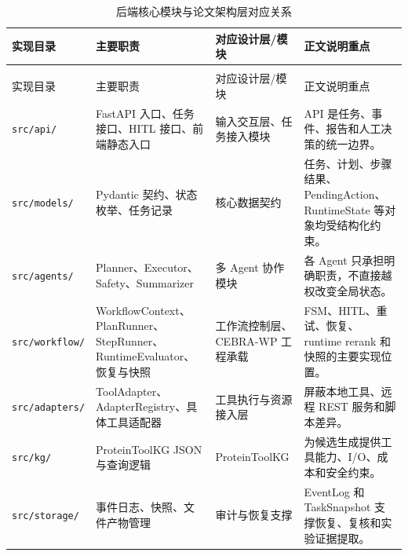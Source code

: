 {%
\begin{longtable}{@{}
  >{\centering\arraybackslash}p{}
  >{\centering\arraybackslash}p{}
  >{\centering\arraybackslash}p{}
  >{\centering\arraybackslash}p{}@{}}
\caption{后端核心模块与论文架构层对应关系}\label{tab:5-1}\\
\toprule
\begin{minipage}[b]{\linewidth}\centering
实现目录
\end{minipage} & \begin{minipage}[b]{\linewidth}\centering
主要职责
\end{minipage} & \begin{minipage}[b]{\linewidth}\centering
对应设计层/模块
\end{minipage} & \begin{minipage}[b]{\linewidth}\centering
正文说明重点
\end{minipage} \\
\midrule
\endfirsthead
\multicolumn{4}{r}{表\thetable（续表）} \\
\toprule
\begin{minipage}[b]{\linewidth}\centering
实现目录
\end{minipage} & \begin{minipage}[b]{\linewidth}\centering
主要职责
\end{minipage} & \begin{minipage}[b]{\linewidth}\centering
对应设计层/模块
\end{minipage} & \begin{minipage}[b]{\linewidth}\centering
正文说明重点
\end{minipage} \\
\midrule
\endhead
\midrule
\endfoot
\bottomrule
\endlastfoot
\texttt{src/api/} & FastAPI 入口、任务接口、HITL 接口、前端静态入口 &
输入交互层、任务接入模块 & API
是任务、事件、报告和人工决策的统一边界。 \\
\texttt{src/models/} & Pydantic 契约、状态枚举、任务记录 & 核心数据契约
& 任务、计划、步骤结果、PendingAction、RuntimeState
等对象均受结构化约束。 \\
\texttt{src/agents/} & Planner、Executor、Safety、Summarizer & 多 Agent
协作模块 & 各 Agent 只承担明确职责，不直接越权改变全局状态。 \\
\texttt{src/workflow/} &
WorkflowContext、PlanRunner、StepRunner、RuntimeEvaluator、恢复与快照 &
工作流控制层、CEBRA-WP 工程承载 & FSM、HITL、重试、恢复、runtime rerank
和快照的主要实现位置。 \\
\texttt{src/adapters/} & ToolAdapter、AdapterRegistry、具体工具适配器 &
工具执行与资源接入层 & 屏蔽本地工具、远程 REST 服务和脚本差异。 \\
\texttt{src/kg/} & ProteinToolKG JSON 与查询逻辑 & ProteinToolKG &
为候选生成提供工具能力、I/O、成本和安全约束。 \\
\texttt{src/storage/} & 事件日志、快照、文件产物管理 & 审计与恢复支撑 &
EventLog 和 TaskSnapshot 支撑恢复、复核和实验证据提取。 \\
\end{longtable}
}


